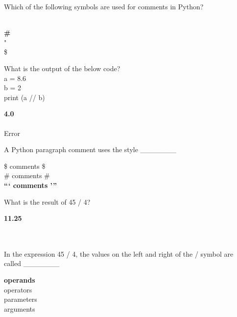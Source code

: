 \documentclass{exam}
\begin{document}
\begin{questions}
    \question Which of the following symbols are used for comments in Python?
    
    \begin{oneparchoices}
        \choice * \\
        \choice \textbf{\#} \\
        \choice " \\
        \choice \$
    \end{oneparchoices}

    \question What is the output of the below code? \\

        a = 8.6 \\
        b = 2 \\
        print (a // b)\\

    \begin{oneparchoices}
        \choice \textbf{4.0} \\
         \\
        \choice Error \\
    \end{oneparchoices}

    \question A Python paragraph comment uses the style \_\_\_\_\_\_\_

    \begin{oneparchoices}
        \choice \$ comments \$  \\
        \choice \# comments \# \\ 
        \choice \textbf {``` comments '''}
    \end{oneparchoices}

    \question What is the result of 45 / 4?

    \begin{oneparchoices}
        \choice \textbf{11.25} \\
         \\
         \\
    \end{oneparchoices}

    \question In the expression 45 / 4, the values on the left and right of the / symbol are called \_\_\_\_\_\_\_

    \begin{oneparchoices}
        \choice \textbf{operands} \\
        \choice operators \\
        \choice parameters \\
        \choice arguments
    \end{oneparchoices}


\end{questions}
\end{document}
